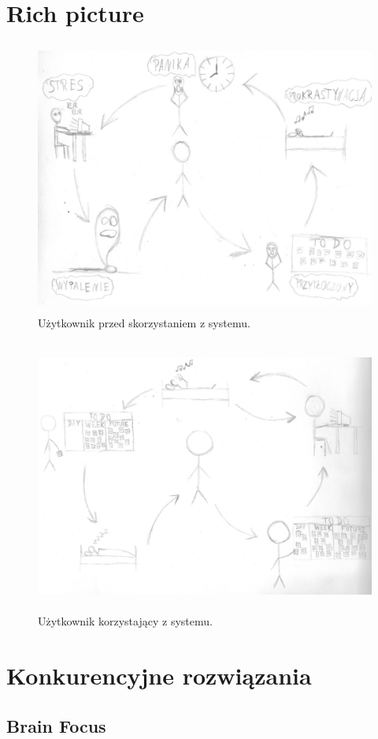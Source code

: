 \documentclass[a4paper,11pt]{report}
\begin{document}
\section {Rich picture}
\begin{figure}[h]
	\centering
	\includegraphics[width=\textwidth, height=9cm]{richpicture1}
	\caption{Użytkownik przed skorzystaniem z systemu.}
	\label{fig:rich1}
\end{figure}
\begin{figure}[h]
	\centering
	\includegraphics[width=\textwidth, height=9cm]{richpicture2}
	\caption{Użytkownik korzystający z systemu.}
	\label{fig:rich2}
\end{figure}
\section {Konkurencyjne rozwiązania}
\subsection{Brain Focus}
\end{document}
